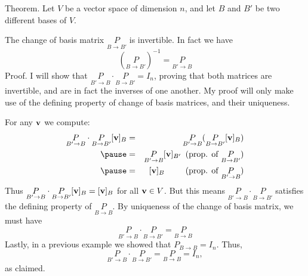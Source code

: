 \begin{frame}
\alert{Theorem}. Let $V$ be a vector space of dimension $n$, and let $B$ and $B'$ be two different bases of $V$. 

The change of basis matrix $\underset{B\rightarrow B'}{P}$ is invertible. In fact we have 
\[
(\underset{B\rightarrow B'}{P})^{-1}=\underset{B'\rightarrow B}{P}
\]
\pause
\alert{Proof}. \scriptsize 
I will show that $\underset{B'\rightarrow B}{P}\cdot\underset{B\rightarrow B'}{P}=I_n$, proving that both matrices are invertible, and are in fact the inverses of one another. My proof will only make use of the defining property of change of basis matrices, and their uniqueness.

For any ${\mathbf v}$ we compute:
\begin{eqnarray*}
\underset{B'\rightarrow B}{P}\cdot\underset{B\rightarrow B'}{P}[\boldv]_B&=&\underset{B'\rightarrow B}{P}(\underset{B\rightarrow B'}{P}[\boldv]_B)\\
\pause&=&\underset{B'\rightarrow B}{P}[\boldv]_{B'} \hspace{5pt} \text{(prop. of $\underset{B\rightarrow B'}{P}$)}\\
\pause&=&[\boldv]_{B} \hspace{25pt} \text{(prop. of $\underset{B'\rightarrow B}{P}$)}
\end{eqnarray*}
\pause
Thus $\underset{B'\rightarrow B}{P}\cdot\underset{B\rightarrow B'}{P}[{\mathbf v}]_B=[{\mathbf v}]_B$ for all ${\mathbf v}\in V$. But this means $\underset{B'\rightarrow B}{P}\cdot\underset{B\rightarrow B'}{P}$ satisfies the defining property of $\underset{B\rightarrow B}{P}$.  
\bpause
By \alert{uniqueness} of the change of basis matrix, we must have 
\[
\underset{B'\rightarrow B}{P}\cdot\underset{B\rightarrow B'}{P}=\underset{B\rightarrow B}{P}
\]
\pause Lastly, in a previous example we showed that $P_{B\rightarrow B}=I_n$. Thus, 
\[
\underset{B'\rightarrow B}{P}\cdot\underset{B\rightarrow B'}{P}=\underset{B\rightarrow B}{P}=I_n,
\]
as claimed. 

\end{frame}
